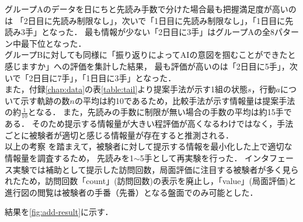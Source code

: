 グループAのデータを日にちと先読み手数で分けた場合最も把握満足度が高いのは
「2日目に先読み制限なし」，次いで「1日目に先読み制限なし」，「1日目に先読み3手」となった．
最も情報が少ない「2日目に3手」はグループAの全8パターン中最下位となった．\\


グループBに対しても同様に「振り返りによってAIの意図を掴むことができたと感じますか」への評価を集計した結果，
最も評価が高いのは「2日目に5手」，次いで「2日目に7手」，「1日目に3手」となった．\\



また，付録\ref{chap:data}の表\ref{table:tail}より提案手法が示す1組の状態$s$，行動$a$について示す軌跡の数$n$の平均は約10であるため，比較手法が示す情報量は提案手法の約$\frac{1}{10}$となる．
また，先読みの手数に制限が無い場合の手数の平均は約15手である．
そのため提示する情報量が大きい程評価が高くなるわけではなく，手法ごとに被験者が適切と感じる情報量が存在すると推測される．\\

以上の考察
を踏まえて，被験者に対して提示する情報を最小化した上で適切な情報量を調査するため，
先読みを1$\sim$5手として再実験を行った．
インタフェース実験では補助として提示した訪問回数，局面評価に注目する被験者が多く見られたため，訪問回数「count」(訪問回数)の表示を廃止し，「value」(局面評価)と進行図の閲覧は被験者の手番（先番）となる盤面でのみ可能とした．

結果を\ref{fig:add-result}に示す．

\begin{table}[H]
    \caption{先読み手数制限なしの場合(追加実験)}
    \scriptsize
    \centering
    \label{table:add-result}
\end{table}


